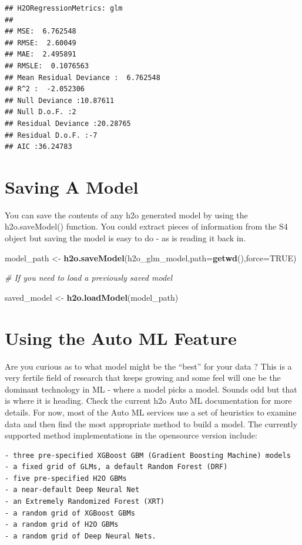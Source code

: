 \documentclass[]{book}
\newenvironment{Shaded}{\begin{snugshade}}{\end{snugshade}}
\newcommand{\KeywordTok}[1]{\textcolor[rgb]{0.13,0.29,0.53}{\textbf{#1}}}
\newcommand{\DataTypeTok}[1]{\textcolor[rgb]{0.13,0.29,0.53}{#1}}
\newcommand{\StringTok}[1]{\textcolor[rgb]{0.31,0.60,0.02}{#1}}
\newcommand{\CommentTok}[1]{\textcolor[rgb]{0.56,0.35,0.01}{\textit{#1}}}
\newcommand{\OtherTok}[1]{\textcolor[rgb]{0.56,0.35,0.01}{#1}}
\newcommand{\NormalTok}[1]{#1}
\begin{document}
\begin{verbatim}
## H2ORegressionMetrics: glm
## 
## MSE:  6.762548
## RMSE:  2.60049
## MAE:  2.495891
## RMSLE:  0.1076563
## Mean Residual Deviance :  6.762548
## R^2 :  -2.052306
## Null Deviance :10.87611
## Null D.o.F. :2
## Residual Deviance :20.28765
## Residual D.o.F. :-7
## AIC :36.24783
\end{verbatim}

\section{Saving A Model}\label{saving-a-model}

You can save the contents of any h2o generated model by using the
h2o.saveModel() function. You could extract pieces of information from
the S4 object but saving the model is easy to do - as is reading it back
in.

\begin{Shaded}
\begin{Highlighting}[]
\NormalTok{model_path <-}\StringTok{ }\KeywordTok{h2o.saveModel}\NormalTok{(h2o_glm_model,}\DataTypeTok{path=}\KeywordTok{getwd}\NormalTok{(),}\DataTypeTok{force=}\OtherTok{TRUE}\NormalTok{)}

\CommentTok{# If you need to load a previously saved model}

\NormalTok{saved_model <-}\StringTok{ }\KeywordTok{h2o.loadModel}\NormalTok{(model_path)}
\end{Highlighting}
\end{Shaded}

\section{Using the Auto ML Feature}\label{using-the-auto-ml-feature}

Are you curious as to what model might be the ``best'' for your data ?
This is a very fertile field of research that keeps growing and some
feel will one be the dominant technology in ML - where a model picks a
model. Sounds odd but that is where it is heading. Check the current h2o
Auto ML documentation for more details. For now, most of the Auto ML
services use a set of heuristics to examine data and then find the most
appropriate method to build a model. The currently supported method
implementations in the opensource version include:

\begin{verbatim}
- three pre-specified XGBoost GBM (Gradient Boosting Machine) models
- a fixed grid of GLMs, a default Random Forest (DRF)
- five pre-specified H2O GBMs
- a near-default Deep Neural Net
- an Extremely Randomized Forest (XRT)
- a random grid of XGBoost GBMs
- a random grid of H2O GBMs
- a random grid of Deep Neural Nets.
\end{verbatim}
\end{document}
